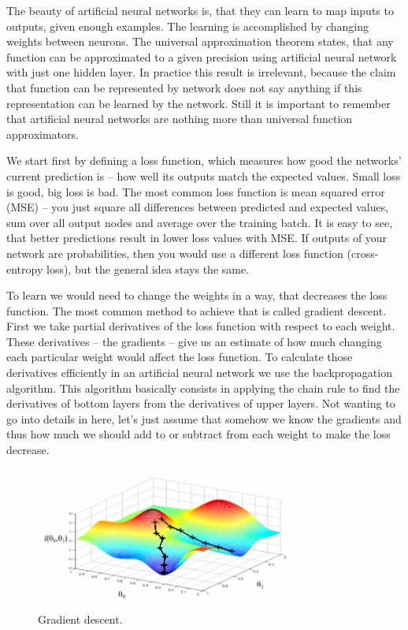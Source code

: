 \documentclass[a4paper,11pt]{article}
\begin{document}
\newpage

The beauty of artificial neural networks is, that they can learn to map inputs to outputs, given enough examples. The learning is accomplished by changing weights between neurons. The universal approximation theorem states, that any function can be approximated to a given precision using artificial neural network with just one hidden layer. In practice this result is irrelevant, because the claim that function can be represented by network does not say anything if this representation can be learned by the network. Still it is important to remember that artificial neural networks are nothing more than universal function approximators.

We start first by defining a loss function, which measures how good the networks' current prediction is -- how well its outputs match the expected values. Small loss is good, big loss is bad. The most common loss function is mean squared error (MSE) -- you just square all differences between predicted and expected values, sum over all output nodes and average over the training batch. It is easy to see, that better predictions result in lower loss values with MSE. If outputs of your network are probabilities, then you would use a different loss function (cross-entropy loss), but the general idea stays the same.

To learn we would need to change the weights in a way, that decreases the loss function. The most common method to achieve that is called gradient descent. First we take partial derivatives of the loss function with respect to each weight. These derivatives -- the gradients -- give us an estimate of how much changing each particular weight would affect the loss function. To calculate those derivatives efficiently in an artificial neural network we use the backpropagation algorithm. This algorithm basically consists in applying the chain rule to find the derivatives of bottom layers from the derivatives of upper layers. Not wanting to go into details in here, let's just assume that somehow we know the gradients and thus how much we should add to or subtract from each weight to make the loss decrease.

\begin{figure}[h]
	\centering
	\includegraphics[width=0.8\textwidth]{gradient_descent.png}
	\caption{Gradient descent.}
	\label{gradient_descent}
%
%
\end{figure}
\end{document}
